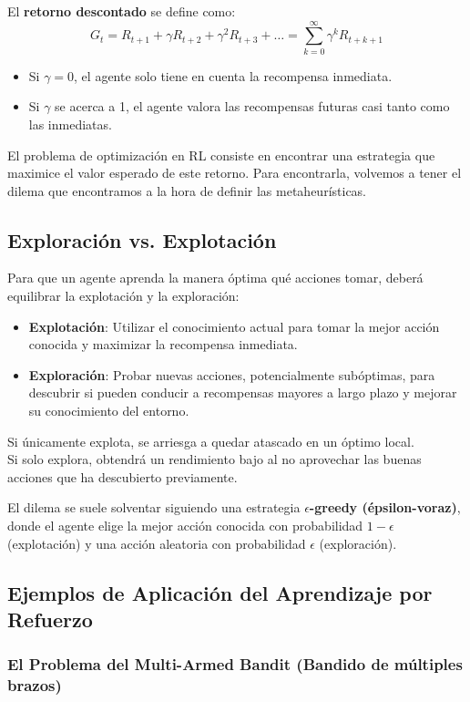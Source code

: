 \documentclass[12pt,a4paper]{book}
\begin{document}
El \textbf{retorno descontado} se define como:
\[ G_t = R_{t+1} + \gamma R_{t+2} + \gamma^2 R_{t+3} + \dots = \sum_{k=0}^{\infty} \gamma^k R_{t+k+1} \]

\begin{itemize}
    \item Si $\gamma = 0$, el agente solo tiene en cuenta la recompensa inmediata.
    \item Si $\gamma$ se acerca a 1, el agente valora las recompensas futuras casi tanto como las inmediatas.
\end{itemize}

El problema de optimización en RL consiste en encontrar una estrategia que maximice el valor esperado de este retorno. Para encontrarla, volvemos a tener el dilema que encontramos a la 
hora de definir las metaheurísticas.

\subsection{Exploración vs. Explotación}

Para que un agente aprenda la manera  óptima qué acciones tomar, deberá equilibrar la explotación y la exploración:
\begin{itemize}
    \item \textbf{Explotación}: Utilizar el conocimiento actual para tomar la mejor acción conocida y maximizar la recompensa inmediata.
    \item \textbf{Exploración}: Probar nuevas acciones, potencialmente subóptimas, para descubrir si pueden conducir a recompensas mayores a largo plazo y mejorar su conocimiento del entorno.
\end{itemize}
Si únicamente explota, se arriesga a quedar atascado en un óptimo local.\\
Si solo explora, obtendrá un rendimiento bajo al no aprovechar las buenas acciones que ha descubierto previamente.

El dilema se suele solventar siguiendo una estrategia \textbf{$\epsilon$-greedy (épsilon-voraz)}, donde el agente elige la mejor acción conocida con probabilidad $1-\epsilon$ (explotación) y una acción aleatoria con probabilidad $\epsilon$ (exploración).

\subsection{Ejemplos de Aplicación del Aprendizaje por Refuerzo}

\subsubsection{El Problema del Multi-Armed Bandit (Bandido de múltiples brazos)}
\end{document}

